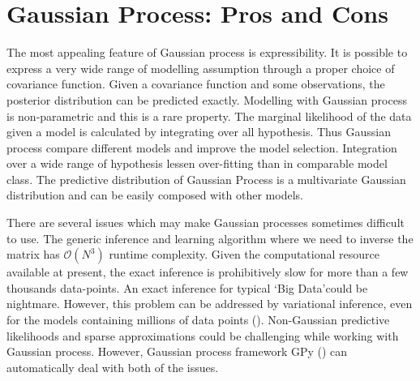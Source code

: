 \section{Gaussian Process: Pros and Cons}
The most appealing feature of Gaussian process is expressibility. It is possible to express a very wide range of modelling assumption through a proper choice of covariance function. Given a covariance function and some observations, the posterior distribution can be predicted exactly. Modelling with Gaussian process is non-parametric and this is a rare property. The marginal likelihood of the data given a model is calculated by integrating over all hypothesis. Thus Gaussian process compare different models and improve the model selection. Integration over a wide range of hypothesis lessen over-fitting than in comparable model class. The predictive distribution of Gaussian Process is a multivariate Gaussian distribution and can be easily composed with other models.

There are several issues which may make Gaussian processes sometimes difficult to use. The generic inference and learning algorithm where we need to inverse the matrix has $\mathcal{O}\left(N^3\right)$ runtime complexity. Given the computational resource available at present, the exact inference is prohibitively slow for more than a few thousands data-points. An exact inference for typical \lq Big Data\rq could be nightmare. However, this problem can be addressed by variational inference, even for the models containing millions of data points (\cite{Hensman:2013a}). Non-Gaussian predictive likelihoods and sparse approximations could be challenging while working with Gaussian process. However, Gaussian process framework GPy (\cite{gpy2014}) can automatically deal with both of the issues. 
